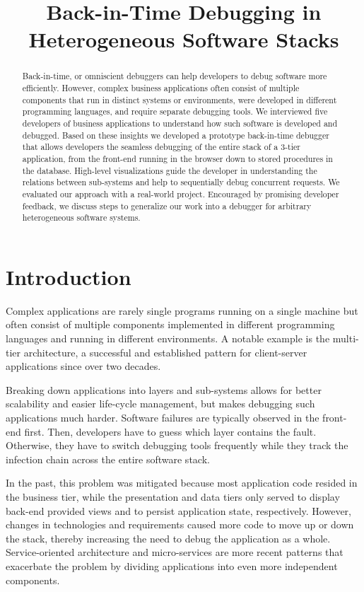 \documentclass[
      english,
			conference,
      ]{IEEEtran}
\title{Back-in-Time Debugging in \\Heterogeneous Software Stacks}
\author{\IEEEauthorblockN{Arian Treffer}
\IEEEauthorblockA{Hasso-Plattner-Institut\\
Potsdam, Germany\\
Email: arian.treffer@hpi.de}
\and
\IEEEauthorblockN{Matthias Uflacker}
\IEEEauthorblockA{Hasso-Plattner-Institut\\
Potsdam, Germany\\
Email: matthias.uflacker@hpi.de}
}
\begin{document}
\maketitle

\begin{abstract}
Back-in-time, or omniscient debuggers can help developers to debug software more efficiently. However, complex business applications often consist of multiple components that run in distinct systems or environments, were developed in different programming languages, and require separate debugging tools.
We interviewed five developers of business applications to understand how such software is developed and debugged. Based on these insights we developed a prototype back-in-time debugger that allows developers the seamless debugging of the entire stack of a 3-tier application, from the front-end running in the browser down to stored procedures in the database.
High-level visualizations guide the developer in understanding the relations between sub-systems and help to sequentially debug concurrent requests. We evaluated our approach with a real-world project. Encouraged by promising developer feedback, we discuss steps to generalize our work into a debugger for arbitrary heterogeneous software systems.
\end{abstract}

\section{Introduction}
\label{sec:introduction}

Complex applications are rarely single programs running on a single machine but often consist of multiple components implemented in different programming languages and running in different environments.
A notable example is the multi-tier architecture, a successful and established pattern for client-server applications since over two decades.

Breaking down applications into layers and sub-systems allows for better scalability and easier life-cycle management, but makes debugging such applications much harder.
Software failures are typically observed in the front-end first.
Then, developers have to guess which layer contains the fault. 
Otherwise, they have to switch debugging tools frequently while they track the infection chain across the entire software stack.

In the past, this problem was mitigated because most application code resided in the business tier, while the presentation and data tiers only served to display back-end provided views and to persist application state, respectively.
However, changes in technologies and requirements caused more code to move up or down the stack, thereby increasing the need to debug the application as a whole.
Service-oriented architecture and micro-services are more recent patterns that exacerbate the problem by dividing applications into even more independent components.
\end{document}

